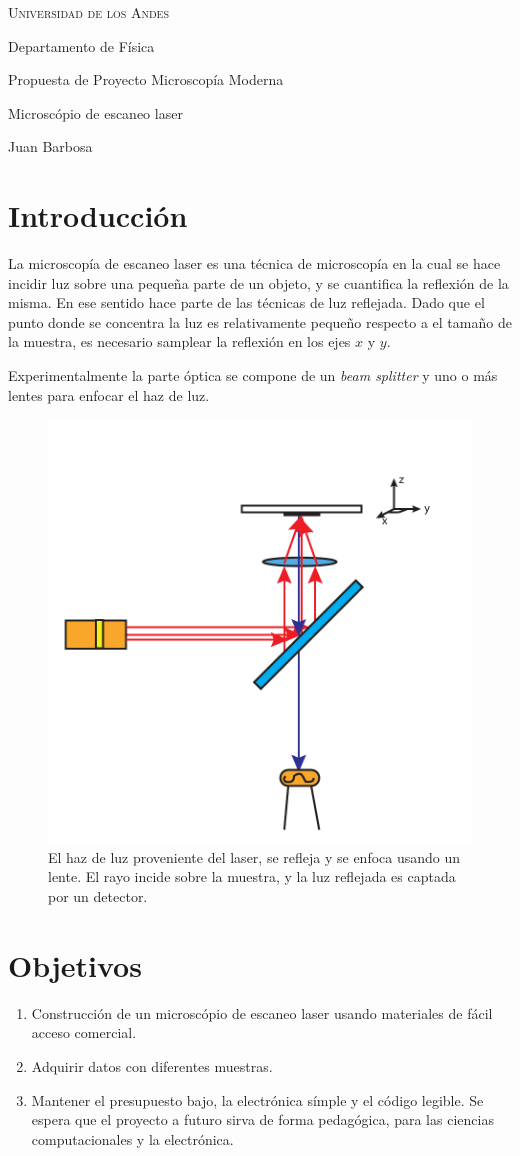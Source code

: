 \documentclass[10pt]{article}
\begin{document}
	{	\centering
		\scshape
		\LARGE
		Universidad de los Andes
		
		\large
		Departamento de F\'isica
		
		\vspace{1cm}
		
		Propuesta de Proyecto Microscop\'ia Moderna
		
		Microsc\'opio de escaneo laser
		
		\normalsize
		Juan Barbosa
		
	}
	
	\section{Introducci\'on}		
		La microscop\'ia de escaneo laser es una t\'ecnica de microscop\'ia en la cual se hace incidir luz sobre una peque\~na parte de un objeto, y se cuantifica la reflexi\'on de la misma. En ese sentido hace parte de las t\'ecnicas de luz reflejada. Dado que el punto donde se concentra la luz es relativamente peque\~no respecto a el tama\~no de la muestra, es necesario samplear la reflexi\'on en los ejes $x$ y $y$.
		
		Experimentalmente la parte \'optica se compone de un \textit{beam splitter} y uno o m\'as lentes para enfocar el haz de luz.
		
		\begin{figure}[h]
			\centering
			\includegraphics[width=0.35\linewidth]{beam.pdf}
			\caption{El haz de luz proveniente del laser, se refleja y se enfoca usando un lente. El rayo incide sobre la muestra, y la luz reflejada es captada por un detector.}
		\end{figure}
	
	\section{Objetivos}
		\begin{enumerate}
			\item Construcci\'on de un microsc\'opio de escaneo laser usando materiales de f\'acil acceso comercial.
			\item Adquirir datos con diferentes muestras.
			\item Mantener el presupuesto bajo, la electr\'onica s\'imple y el c\'odigo legible. Se espera que el proyecto a futuro sirva de forma pedag\'ogica, para las ciencias computacionales y la electr\'onica.
		\end{enumerate}
	
\end{document}
